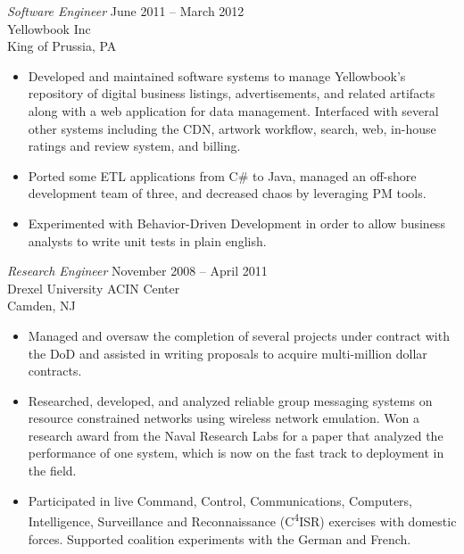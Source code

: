 \documentclass[margin]{res}
\begin{document}
\begin{resume}
  {\sl Software Engineer} \hfill	June 2011 -- March 2012 \\
    Yellowbook Inc \\
    King of Prussia, PA
    \begin{itemize} \itemsep -2pt %
      \item Developed and maintained software systems to manage Yellowbook's repository of digital business listings, advertisements, and related artifacts along with a web application for data management.
            Interfaced with several other systems including the CDN, artwork workflow, search, web, in-house ratings and review system, and billing.
      \item Ported some ETL applications from C\# to Java, managed an off-shore development team of three, and decreased chaos by leveraging PM tools.
      \item Experimented with Behavior-Driven Development in order to allow business analysts to write unit tests in plain english.
    \end{itemize}


  {\sl Research Engineer} \hfill	November 2008 -- April 2011 \\
    Drexel University ACIN Center \\
    Camden, NJ 
    \begin{itemize}  \itemsep -2pt %
      \item Managed and oversaw the completion of several projects under contract with the DoD and assisted in writing proposals to acquire multi-million dollar contracts.
      \item Researched, developed, and analyzed reliable group messaging systems on resource constrained networks using wireless network emulation.
            Won a research award from the Naval Research Labs for a paper that analyzed the performance of one system, which is now on the fast track to deployment in the field.
      \item Participated in live Command, Control, Communications, Computers, Intelligence, Surveillance and Reconnaissance (C\textsuperscript{4}ISR) exercises  with domestic forces. Supported coalition experiments with the German and French.
    \end{itemize}


\end{resume}
\end{document}
